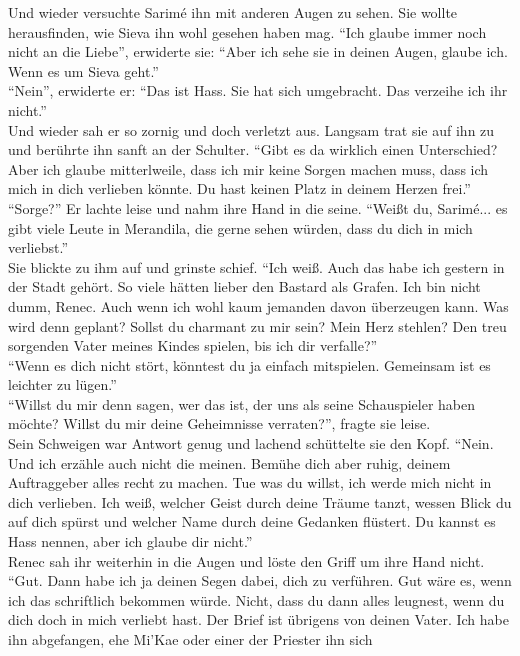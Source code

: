 Und wieder versuchte Sarimé ihn mit anderen Augen zu sehen. Sie wollte herausfinden, wie Sieva ihn 
wohl gesehen haben mag. ``Ich glaube immer noch nicht an die Liebe'', erwiderte sie: ``Aber ich 
sehe sie in deinen Augen, glaube ich. Wenn es um Sieva geht.''\\
``Nein'', erwiderte er: ``Das ist Hass. Sie hat sich umgebracht. Das verzeihe ich ihr nicht.''\\
Und wieder sah er so zornig und doch verletzt aus. Langsam trat sie auf ihn zu und berührte ihn 
sanft an der Schulter. ``Gibt es da wirklich einen Unterschied? Aber ich glaube mitterlweile, dass 
ich mir keine Sorgen machen muss, dass ich mich in dich verlieben könnte. Du hast keinen Platz in 
deinem Herzen frei.''\\
``Sorge?'' Er lachte leise und nahm ihre Hand in die seine. ``Weißt du, Sarimé... es gibt viele 
Leute in Merandila, die gerne sehen würden, dass du dich in mich verliebst.''\\
Sie blickte zu ihm auf und grinste schief. ``Ich weiß. Auch das habe ich gestern in der Stadt 
gehört. So viele hätten lieber den Bastard als Grafen. Ich bin nicht dumm, Renec. Auch wenn ich 
wohl kaum jemanden davon überzeugen kann. Was wird denn geplant? Sollst du charmant zu mir sein? 
Mein Herz stehlen? Den treu sorgenden Vater meines Kindes spielen, bis ich dir verfalle?''\\
``Wenn es dich nicht stört, könntest du ja einfach mitspielen. Gemeinsam ist es leichter zu 
lügen.''\\
``Willst du mir denn sagen, wer das ist, der uns als seine Schauspieler haben möchte? Willst du mir 
deine Geheimnisse verraten?'', fragte sie leise.\\
Sein Schweigen war Antwort genug und lachend schüttelte sie den Kopf. ``Nein. Und ich erzähle auch 
nicht die meinen. Bemühe dich aber ruhig, deinem Auftraggeber alles recht zu machen. Tue was du 
willst, ich werde mich nicht in dich verlieben. Ich weiß, welcher Geist durch deine Träume tanzt, 
wessen Blick du auf dich spürst und welcher Name durch deine Gedanken flüstert. Du kannst es Hass 
nennen, aber ich glaube dir nicht.''\\
Renec sah ihr weiterhin in die Augen und löste den Griff um ihre Hand nicht. ``Gut. Dann habe ich 
ja deinen Segen dabei, dich zu verführen. Gut wäre es, wenn ich das schriftlich bekommen würde. 
Nicht, dass du dann alles leugnest, wenn du dich doch in mich verliebt hast. Der Brief ist 
übrigens von deinen Vater. Ich habe ihn abgefangen, ehe Mi'Kae oder einer der Priester ihn sich 
